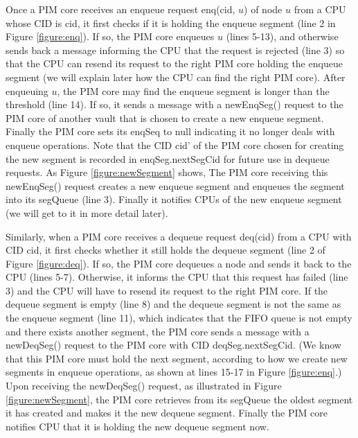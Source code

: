 Once a PIM core receives an enqueue request enq(cid, $u$) of node $u$ from a CPU whose CID is cid,
it first checks if it is holding the enqueue segment (line 2 in Figure \ref{figure:enq}).
If so, the PIM core enqueues $u$ (lines 5-13), and otherwise sends back a message
informing the CPU that the request is rejected (line 3) so that
the CPU can resend its request to the right PIM core holding the enqueue segment
(we will explain later how the CPU can find the right PIM core).
After enqueuing $u$, the PIM core may find the enqueue segment is longer than the threshold (line 14).
If so, it sends a message with a newEnqSeg() request to the PIM core of another vault that is chosen 
to create a new enqueue segment.
Finally the PIM core sets its enqSeq to null indicating it no longer deals with enqueue operations.
Note that the CID cid' of the PIM core chosen for creating the new segment is recorded in 
enqSeg.nextSegCid for future use in dequeue requests.
As Figure \ref{figure:newSegment} shows,
The PIM core receiving this newEnqSeg() request creates a new enqueue segment and enqueues 
the segment into its segQueue (line 3). 
Finally it notifies CPUs of the new enqueue segment (we will get to it in more detail later).

Similarly, when a PIM core receives a dequeue request deq(cid) from a CPU with CID cid,
it first checks whether it still holds the dequeue segment (line 2 of Figure \ref{figure:deq}).
If so, the PIM core dequeues a node and sends it back to the CPU (lines 5-7).
Otherwise, it informs the CPU that this request has failed (line 3) and
the CPU will have to resend its request to the right PIM core.
If the dequeue segment is empty (line 8) and the dequeue segment is not the same as 
the enqueue segment (line 11), which indicates that the FIFO queue is not empty 
and there exists another segment, the PIM core sends a message with a newDeqSeg() request 
to the PIM core with CID deqSeg.nextSegCid. 
(We know that this PIM core must hold the next segment, 
according to how we create new segments in enqueue operations, 
as shown at lines 15-17 in Figure \ref{figure:enq}.) 
Upon receiving the newDeqSeg() request, as illustrated in Figure \ref{figure:newSegment}, 
the PIM core retrieves from its segQueue the oldest segment it has created and 
makes it the new dequeue segment. 
Finally the PIM core notifies CPU that it is holding the new dequeue segment now.

